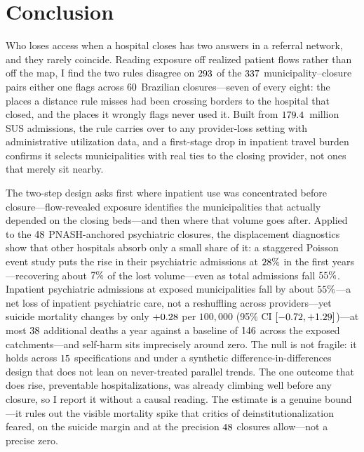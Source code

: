 \section{Conclusion}
\label{sec:conclusion}

Who loses access when a hospital closes has two answers in a referral
network, and they rarely coincide. Reading exposure off realized patient
flows rather than off the map, I find the two rules disagree on
$293$ of the $337$ municipality--closure pairs
either one flags across $60$ Brazilian closures---seven of
every eight: the places a distance rule misses had been crossing borders to
the hospital that closed, and the places it wrongly flags never used it. Built from
$179.4$~million SUS admissions, the rule carries over to any
provider-loss setting with administrative utilization data, and a
first-stage drop in inpatient travel burden confirms it selects
municipalities with real ties to the closing provider, not ones that
merely sit nearby.

The two-step design asks first where inpatient use was concentrated
before closure---flow-revealed exposure identifies the municipalities
that actually depended on the closing beds---and then where that volume
goes after. Applied to the $48$ PNASH-anchored psychiatric
closures, the displacement diagnostics show that other hospitals absorb only a
small share of it: a staggered Poisson event study puts the rise in their
psychiatric admissions at $28\%$ in the first years---recovering
about $7\%$ of the lost volume---even as total admissions fall
$55\%$. Inpatient psychiatric admissions at
exposed municipalities fall by about $55\%$---a net loss of
inpatient psychiatric care, not a reshuffling across providers---yet
suicide mortality changes by only $+0.28$ per $100{,}000$ (95\% CI
$[-0.72, +1.29]$)---at most $38$ additional deaths a
year against a baseline of $146$ across the exposed
catchments---and self-harm sits imprecisely around zero.
The null is not fragile: it holds across $15$ specifications
and under a synthetic difference-in-differences design that does not lean
on never-treated parallel trends. The one outcome that does rise,
preventable hospitalizations, was already climbing well before any
closure, so I report it without a causal reading. The estimate is a
genuine bound---it rules out the visible mortality spike that critics of
deinstitutionalization feared, on the suicide margin and at the precision
$48$ closures allow---not a precise zero.

